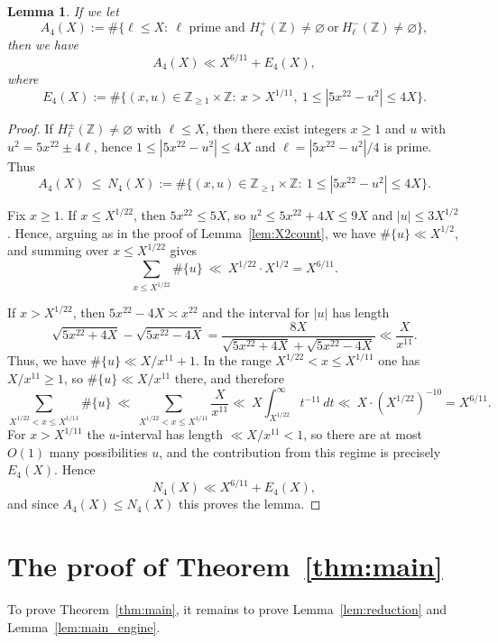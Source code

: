 \documentclass[12pt]{amsart}
\newtheorem{lemma}[theorem]{Lemma}
\theoremstyle{remark}
\numberwithin{equation}{section}
\begin{document}
\begin{lemma}\label{lem:X4count}
If we let
\[
A_4(X):=\#\{\ell\le X:\ \ell \text{ prime and } H_{\ell}^{+}(\mathbb Z)\neq \varnothing\ \text{or}\ H_{\ell}^{-}(\mathbb Z)\neq \varnothing\},
\]
then we have
\[
A_4(X)\ll X^{6/11}+E_4(X),
\]
where
\[
E_4(X):=\#\{(x,u)\in\mathbb Z_{\ge 1}\times\mathbb Z:\ x> X^{1/11},\ 1\le |5x^{22} - u^2|\le 4X\}.
\]
\end{lemma}


\begin{proof}
If $H_{\ell}^{\pm}(\mathbb Z)\neq\varnothing$ with $\ell\le X$,
then there exist integers $x\ge 1$ and $u$ with
$u^2=5x^{22}\pm 4\ell$, hence $1\le |5x^{22} - u^2|\le 4X$ and $\ell=|5x^{22} - u^2|/4$ is prime. Thus
\[
A_4(X)\ \le\ N_4(X):=\#\{(x,u)\in\mathbb Z_{\ge 1}\times \mathbb Z:\ 1\le |5x^{22} - u^2|\le 4X\}.
\]

Fix $x\ge 1$.
If $x\le X^{1/22}$, then $5x^{22}\le 5X$, so $u^2\le 5x^{22}+4X\le 9X$ and $|u|\le 3X^{1/2}$.
Hence, arguing as in the proof of Lemma~\ref{lem:X2count}, we have $\#\{u\}\ll X^{1/2}$, and summing over $x\le X^{1/22}$ gives
\[
\sum_{x\le X^{1/22}}\#\{u\}\ \ll\ X^{1/22}\cdot X^{1/2}=X^{6/11}.
\]

If $x> X^{1/22}$, then $5x^{22}-4X\asymp x^{22}$ and the interval for $|u|$ has length
\[
\sqrt{5x^{22}+4X}-\sqrt{5x^{22}-4X}
=\frac{8X}{\sqrt{5x^{22}+4X}+\sqrt{5x^{22}-4X}}
\ll \frac{X}{x^{11}}.
\]
Thus, we have $\#\{u\}\ll X/x^{11}+1$.
In the range $X^{1/22}<x\le X^{1/11}$ one has $X/x^{11}\ge 1$, so $\#\{u\}\ll X/x^{11}$ there, and therefore
\[
\sum_{X^{1/22}<x\le X^{1/11}}\#\{u\}\ \ll\ \sum_{X^{1/22}<x\le X^{1/11}}\frac{X}{x^{11}}
\ll\ X\int_{X^{1/22}}^\infty t^{-11}\,dt
\ll\ X\cdot (X^{1/22})^{-10}
= X^{6/11}.
\]
For $x> X^{1/11}$ the $u$-interval has length $\ll X/x^{11}<1$,
so there are at most $O(1)$ many possibilities $u$,
and the contribution from this regime is precisely $E_4(X)$.
Hence
\[
N_4(X)\ll X^{6/11}+E_4(X),
\]
and since $A_4(X)\le N_4(X)$ this proves the lemma.
\end{proof}


\section{The proof of Theorem~\ref{thm:main}}\label{sec:proof}

To prove Theorem~\ref{thm:main},
it remains to prove Lemma~\ref{lem:reduction} and Lemma~\ref{lem:main_engine}.
\end{document}
